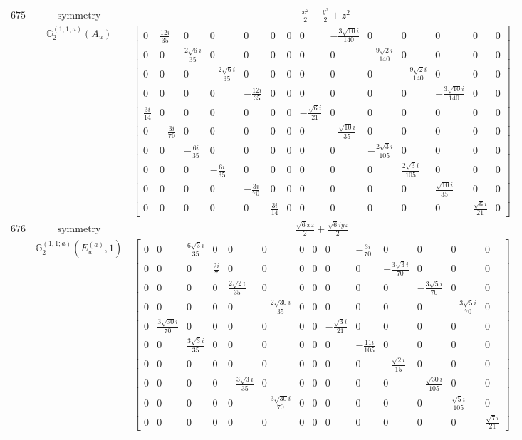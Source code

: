 \documentclass[fleqn,8pt,landscape]{jsarticle}
\begin{document}
\begin{longtable}{ccc}
$ 675 $ & $ \text{symmetry} $ & $ - \frac{x^{2}}{2} - \frac{y^{2}}{2} + z^{2} $ \\
$  $ & $ \mathbb{G}_{2}^{(1,1;a)}(A_{u}) $ & $ \begin{bmatrix} 0 & \frac{12 i}{35} & 0 & 0 & 0 & 0 & 0 & 0 & - \frac{3 \sqrt{10} i}{140} & 0 & 0 & 0 & 0 & 0 \\ 0 & 0 & \frac{2 \sqrt{6} i}{35} & 0 & 0 & 0 & 0 & 0 & 0 & - \frac{9 \sqrt{2} i}{140} & 0 & 0 & 0 & 0 \\ 0 & 0 & 0 & - \frac{2 \sqrt{6} i}{35} & 0 & 0 & 0 & 0 & 0 & 0 & - \frac{9 \sqrt{2} i}{140} & 0 & 0 & 0 \\ 0 & 0 & 0 & 0 & - \frac{12 i}{35} & 0 & 0 & 0 & 0 & 0 & 0 & - \frac{3 \sqrt{10} i}{140} & 0 & 0 \\ \frac{3 i}{14} & 0 & 0 & 0 & 0 & 0 & 0 & - \frac{\sqrt{6} i}{21} & 0 & 0 & 0 & 0 & 0 & 0 \\ 0 & - \frac{3 i}{70} & 0 & 0 & 0 & 0 & 0 & 0 & - \frac{\sqrt{10} i}{35} & 0 & 0 & 0 & 0 & 0 \\ 0 & 0 & - \frac{6 i}{35} & 0 & 0 & 0 & 0 & 0 & 0 & - \frac{2 \sqrt{3} i}{105} & 0 & 0 & 0 & 0 \\ 0 & 0 & 0 & - \frac{6 i}{35} & 0 & 0 & 0 & 0 & 0 & 0 & \frac{2 \sqrt{3} i}{105} & 0 & 0 & 0 \\ 0 & 0 & 0 & 0 & - \frac{3 i}{70} & 0 & 0 & 0 & 0 & 0 & 0 & \frac{\sqrt{10} i}{35} & 0 & 0 \\ 0 & 0 & 0 & 0 & 0 & \frac{3 i}{14} & 0 & 0 & 0 & 0 & 0 & 0 & \frac{\sqrt{6} i}{21} & 0 \end{bmatrix} $ \\ \hline
$ 676 $ & $ \text{symmetry} $ & $ \frac{\sqrt{6} x z}{2} + \frac{\sqrt{6} i y z}{2} $ \\
$  $ & $ \mathbb{G}_{2}^{(1,1;a)}(E_{u}^{(a)},1) $ & $ \begin{bmatrix} 0 & 0 & \frac{6 \sqrt{3} i}{35} & 0 & 0 & 0 & 0 & 0 & 0 & - \frac{3 i}{70} & 0 & 0 & 0 & 0 \\ 0 & 0 & 0 & \frac{2 i}{7} & 0 & 0 & 0 & 0 & 0 & 0 & - \frac{3 \sqrt{3} i}{70} & 0 & 0 & 0 \\ 0 & 0 & 0 & 0 & \frac{2 \sqrt{2} i}{35} & 0 & 0 & 0 & 0 & 0 & 0 & - \frac{3 \sqrt{5} i}{70} & 0 & 0 \\ 0 & 0 & 0 & 0 & 0 & - \frac{2 \sqrt{30} i}{35} & 0 & 0 & 0 & 0 & 0 & 0 & - \frac{3 \sqrt{5} i}{70} & 0 \\ 0 & \frac{3 \sqrt{30} i}{70} & 0 & 0 & 0 & 0 & 0 & 0 & - \frac{\sqrt{3} i}{21} & 0 & 0 & 0 & 0 & 0 \\ 0 & 0 & \frac{3 \sqrt{3} i}{35} & 0 & 0 & 0 & 0 & 0 & 0 & - \frac{11 i}{105} & 0 & 0 & 0 & 0 \\ 0 & 0 & 0 & 0 & 0 & 0 & 0 & 0 & 0 & 0 & - \frac{\sqrt{2} i}{15} & 0 & 0 & 0 \\ 0 & 0 & 0 & 0 & - \frac{3 \sqrt{3} i}{35} & 0 & 0 & 0 & 0 & 0 & 0 & - \frac{\sqrt{30} i}{105} & 0 & 0 \\ 0 & 0 & 0 & 0 & 0 & - \frac{3 \sqrt{30} i}{70} & 0 & 0 & 0 & 0 & 0 & 0 & \frac{\sqrt{5} i}{105} & 0 \\ 0 & 0 & 0 & 0 & 0 & 0 & 0 & 0 & 0 & 0 & 0 & 0 & 0 & \frac{\sqrt{7} i}{21} \end{bmatrix} $ \\ \hline

\end{longtable}
\end{document}
